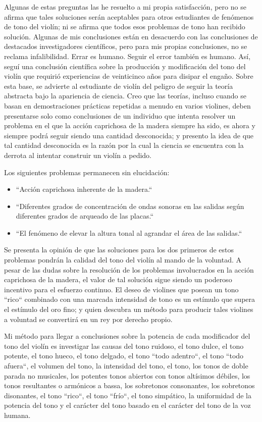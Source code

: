 Algunas de estas preguntas las he resuelto a mi propia satisfacción, pero no se afirma que tales soluciones serán aceptables para otros estudiantes de fenómenos de tono del violín; ni se afirma que todos esos problemas de tono han recibido solución. Algunas de mis conclusiones están en desacuerdo con las conclusiones de destacados investigadores científicos, pero para mis propias conclusiones, no se reclama infalibilidad. Errar es humano. Seguir el error también es humano. Así, seguí una conclusión científica sobre la producción y modificación del tono del violín que requirió experiencias de veinticinco años para disipar el engaño. Sobre esta base, se advierte al estudiante de violín del peligro de seguir la teoría abstracta bajo la apariencia de ciencia. Creo que las teorías, incluso cuando se basan en demostraciones prácticas repetidas a menudo en varios violines, deben presentarse solo como conclusiones de un individuo que intenta resolver un problema en el que la acción caprichosa de la madera siempre ha sido, es ahora y siempre podrá seguir siendo una cantidad desconocida; y presento la idea de que tal cantidad desconocida es la razón por la cual la ciencia se encuentra con la derrota al intentar construir un violín a pedido.




Los siguientes problemas permanecen sin elucidación:
\begin{itemize}
    \item ``Acción caprichosa inherente de la madera.``
    \item ``Diferentes grados de concentración de ondas sonoras en las salidas según diferentes grados de arqueado de las placas.``
    \item ``El fenómeno de elevar la altura tonal al agrandar el área de las salidas.``
\end{itemize}

Se presenta la opinión de que las soluciones para los dos primeros de estos problemas pondrán la calidad del tono del violín al mando de la voluntad. A pesar de las dudas sobre la resolución de los problemas involucrados en la acción caprichosa de la madera, el valor de tal solución sigue siendo un poderoso incentivo para el esfuerzo continuo. El deseo de violines que posean un tono ``rico`` combinado con una marcada intensidad de tono es un estímulo que supera el estímulo del oro fino; y quien descubra un método para producir tales violines a voluntad se convertirá en un rey por derecho propio.

Mi método para llegar a conclusiones sobre la potencia de cada modificador del tono del violín es investigar las causas del tono ruidoso, el tono dulce, el tono potente, el tono hueco, el tono delgado, el tono ``todo adentro``, el tono ``todo afuera``, el volumen del tono, la intensidad del tono, el tono, los tonos de doble parada no musicales, los potentes tonos abiertos con tonos altísimos débiles, los tonos resultantes o armónicos a bassa, los sobretonos consonantes, los sobretonos disonantes, el tono ``rico``, el tono ``frío``, el tono simpático, la uniformidad de la potencia del tono y el carácter del tono basado en el carácter del tono de la voz humana.

